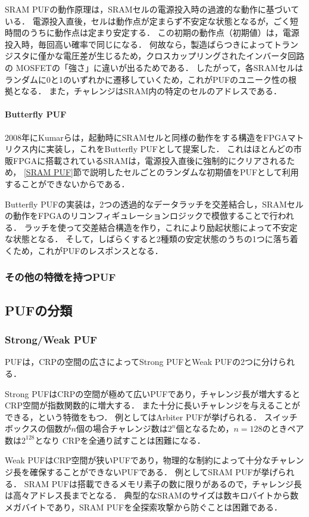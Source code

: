 \documentclass[technicalreport]{ieicej} %
\begin{document}
SRAM PUFの動作原理は，SRAMセルの電源投入時の過渡的な動作に基づいている．
電源投入直後，セルは動作点が定まらず不安定な状態となるが，ごく短時間のうちに動作点は定まり安定する．
この初期の動作点（初期値）は，電源投入時，毎回高い確率で同じになる．
何故なら，製造ばらつきによってトランジスタに僅かな電圧差が生じるため，クロスカップリングされたインバータ回路の
MOSFETの「強さ」に違いが出るためである\cite{maes1}．
したがって，各SRAMセルはランダムに0と1のいずれかに遷移していくため，これがPUFのユニーク性の根拠となる．
また，チャレンジはSRAM内の特定のセルのアドレスである．
\paragraph{Butterfly PUF}
2008年にKumarらは，起動時にSRAMセルと同様の動作をする構造をFPGAマトリクス内に実装し，これをButterfly PUF\cite{kumar}として提案した．
これはほとんどの市販FPGAに搭載されているSRAMは，電源投入直後に強制的にクリアされるため，
\ref{SRAM PUF}節で説明したセルごとのランダムな初期値をPUFとして利用することができないからである．

Butterfly PUFの実装は，2つの透過的なデータラッチを交差結合し，SRAMセルの動作をFPGAのリコンフィギュレーションロジックで模倣することで行われる．
ラッチを使って交差結合構造を作り，これにより励起状態によって不安定な状態となる．
そして，しばらくすると2種類の安定状態のうちの1つに落ち着くため，これがPUFのレスポンスとなる．
\subsubsection{その他の特徴を持つPUF}

\subsection{PUFの分類}
\subsubsection{Strong/Weak PUF}
PUFは，CRPの空間の広さによってStrong PUFとWeak PUFの2つに分けられる．

Strong PUFはCRPの空間が極めて広いPUFであり，チャレンジ長が増大するとCRP空間が指数関数的に増大する．
また十分に長いチャレンジを与えることができる，という特徴をもつ．
例としてはArbiter PUFが挙げられる．
スイッチボックスの個数が$n$個の場合チャレンジ数は$2^n$個となるため，$n=128$のときペア数は$2^{128}$となり
CRPを全通り試すことは困難になる．

Weak PUFはCRP空間が狭いPUFであり，物理的な制約によって十分なチャレンジ長を確保することができないPUFである．
例としてSRAM PUFが挙げられる．
SRAM PUFは搭載できるメモリ素子の数に限りがあるので，チャレンジ長は高々アドレス長までとなる．
典型的なSRAMのサイズは数キロバイトから数メガバイトであり，SRAM PUFを全探索攻撃から防ぐことは困難である．
\end{document}
